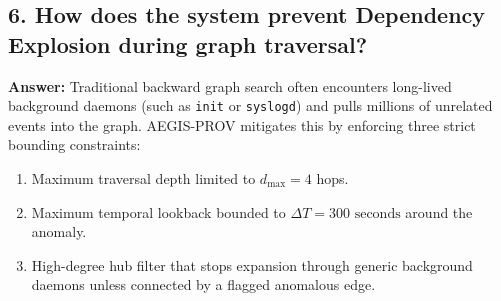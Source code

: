 \documentclass[11pt,a4paper]{report}
\begin{document}
\subsection{6. How does the system prevent Dependency Explosion during graph traversal?}
\textbf{Answer:} Traditional backward graph search often encounters long-lived background daemons (such as \texttt{init} or \texttt{syslogd}) and pulls millions of unrelated events into the graph. AEGIS-PROV mitigates this by enforcing three strict bounding constraints:
\begin{enumerate}
    \item Maximum traversal depth limited to $d_{\text{max}} = 4$ hops.
    \item Maximum temporal lookback bounded to $\Delta T = 300\text{ seconds}$ around the anomaly.
    \item High-degree hub filter that stops expansion through generic background daemons unless connected by a flagged anomalous edge.
\end{enumerate}
\end{document}
